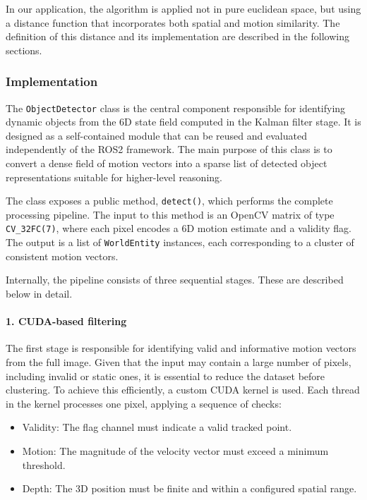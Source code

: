 In our application, the algorithm is applied not in pure euclidean space, but using a
distance function that incorporates both spatial and motion similarity. The definition
of this distance and its implementation are described in the following sections.

\subsubsection{Implementation}
\label{sec:ObjectDetectionClass}

The \texttt{ObjectDetector} class is the central component responsible for identifying
dynamic objects from the 6D state field computed in the Kalman filter stage. It is
designed as a self-contained module that can be reused and evaluated independently of
the ROS2 framework. The main purpose of this class is to convert a dense field of
motion vectors into a sparse list of detected object representations suitable for
higher-level reasoning.

The class exposes a public method, \texttt{detect()}, which performs the complete
processing pipeline. The input to this method is an OpenCV matrix of type
\texttt{CV\_32FC(7)}, where each pixel encodes a 6D motion estimate and a validity
flag. The output is a list of \texttt{WorldEntity} instances, each corresponding to a
cluster of consistent motion vectors.

Internally, the pipeline consists of three sequential stages. These are described below
in detail.

\paragraph{1. CUDA-based filtering}

The first stage is responsible for identifying valid and informative motion vectors
from the full image. Given that the input may contain a large number of pixels,
including invalid or static ones, it is essential to reduce the dataset before
clustering. To achieve this efficiently, a custom CUDA kernel is used. Each thread in
the kernel processes one pixel, applying a sequence of checks:

\begin{itemize}
  \item Validity: The flag channel must indicate a valid tracked point.
  \item Motion: The magnitude of the velocity vector must exceed a minimum threshold.
  \item Depth: The 3D position must be finite and within a configured spatial range.
\end{itemize}

